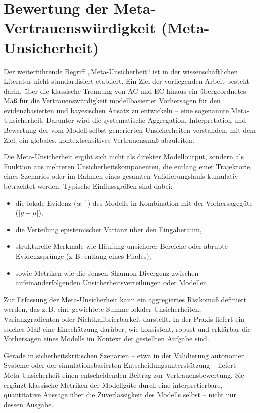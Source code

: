 \section{Bewertung der Meta-Vertrauenswürdigkeit (Meta-Unsicherheit)}

Der weiterführende Begriff „Meta-Unsicherheit“ ist in der wissenschaftlichen Literatur nicht standardisiert etabliert. Ein Ziel der vorliegenden Arbeit besteht darin, über die klassische Trennung von AC und EC hinaus ein übergeordnetes Maß für die Vertrauenswürdigkeit modellbasierter Vorhersagen für den evidenzbasierten und bayesischen Ansatz zu entwickeln – eine sogenannte Meta-Unsicherheit. Darunter wird die systematische Aggregation, Interpretation und Bewertung der vom Modell selbst generierten Unsicherheiten verstanden, mit dem Ziel, ein globales, kontextsensitives Vertrauensmaß abzuleiten. 

Die Meta-Unsicherheit ergibt sich nicht als direkter Modelloutput, sondern als Funktion aus mehreren Unsicherheitskomponenten, die entlang einer Trajektorie, eines Szenarios oder im Rahmen eines gesamten Validierungslaufs kumulativ betrachtet werden. Typische Einflussgrößen sind dabei:
\begin{itemize}
  \item die lokale Evidenz (\(\alpha^{-1}\)) des Modells in Kombination mit der Vorhersagegüte (\(\left| y - \mu \right|\)),
  \item die Verteilung epistemischer Varianz über den Eingaberaum,
  \item strukturelle Merkmale wie Häufung unsicherer Bereiche oder abrupte Evidenzsprünge (z.\,B. entlang eines Pfades),
  \item sowie Metriken wie die Jensen-Shannon-Divergenz zwischen aufeinanderfolgenden Unsicherheitsverteilungen oder Modellen.
\end{itemize}

Zur Erfassung der Meta-Unsicherheit kann ein aggregiertes Risikomaß definiert werden, das z.\,B. eine gewichtete Summe lokaler Unsicherheiten, Varianzgradienten oder Nichtkalibrierbarkeit darstellt. In der Praxis liefert ein solches Maß eine Einschätzung darüber, wie konsistent, robust und erklärbar die Vorhersagen eines Modells im Kontext der gestellten Aufgabe sind.

Gerade in sicherheitskritischen Szenarien – etwa in der Validierung autonomer Systeme oder der simulationsbasierten Entscheidungsunterstützung – liefert Meta-Unsicherheit einen entscheidenden Beitrag zur Vertrauensbewertung. Sie ergänzt klassische Metriken der Modellgüte durch eine interpretierbare, quantitative Aussage über die Zuverlässigkeit des Modells selbst – nicht nur dessen Ausgabe.

